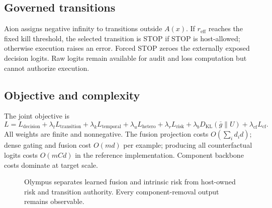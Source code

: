 \documentclass[10pt]{article}
\begin{document}
\subsection{Governed transitions}
Aion assigns negative infinity to transitions outside $A(x)$. If $r_{\mathrm{eff}}$ reaches
the fixed kill threshold, the selected transition is STOP if STOP is host-allowed;
otherwise execution raises an error. Forced STOP zeroes the externally exposed decision
logits. Raw logits remain available for audit and loss computation but cannot authorize
execution.

\subsection{Objective and complexity}
The joint objective is
\begin{equation}
L=L_{\mathrm{decision}}+\lambda_tL_{\mathrm{transition}}
+\lambda_kL_{\mathrm{temporal}}+\lambda_uL_{\mathrm{hetero}}
+\lambda_rL_{\mathrm{risk}}+\lambda_bD_{\mathrm{KL}}(\bar g\|U)
+\lambda_{\mathrm{cf}}L_{\mathrm{cf}}.
\end{equation}
All weights are finite and nonnegative. The fusion projection costs
$O(\sum_i d_i d)$; dense gating and fusion cost $O(md)$ per example; producing all
counterfactual logits costs $O(mCd)$ in the reference implementation. Component backbone
costs dominate at target scale.

\begin{figure}[H]
\centering
{}
\caption{Olympus separates learned fusion and intrinsic risk from host-owned risk and
transition authority. Every component-removal output remains observable.}
\label{fig:architecture}
\end{figure}
\end{document}
